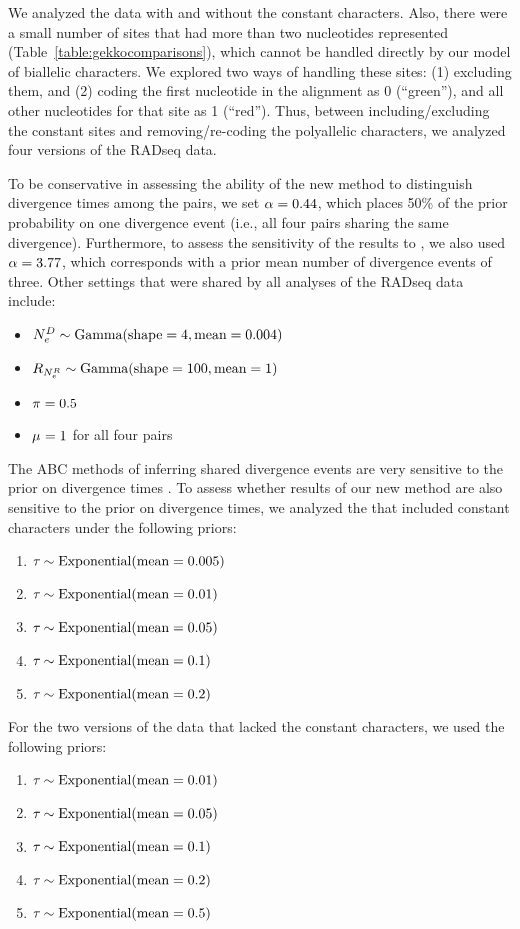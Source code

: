 \ifembed{

}{}

We analyzed the data with and without the constant characters.
Also, there were a small number of sites that had more than two nucleotides
represented
(Table~\ref{table:gekkocomparisons}),
which cannot be handled directly by our model of biallelic characters.
We explored two ways of handling these sites:
(1) excluding them, and
(2) coding the first nucleotide in the alignment as 0 (``green''), and all
other nucleotides for that site as 1 (``red'').
Thus, between including/excluding the constant sites and removing/re-coding the
polyallelic characters, we analyzed four versions of the RADseq data.

To be conservative in assessing the ability of the new method to distinguish
divergence times among the pairs, we set $\concentration = 0.44$, which places
50\% of the prior probability on one divergence event (i.e., all four pairs
sharing the same divergence).
Furthermore, to assess the sensitivity of the results to \concentration, we
also used $\concentration = 3.77$, which corresponds with a prior mean number
of divergence events of three.
Other settings that were shared by all analyses of the  RADseq data
include:
\begin{itemize}
    \item $\epopsize[\descendantpopindex{}] \sim \dgamma{4}{0.004}$
    \item $\rootrelativepopsize \sim \dgamma{100}{1}$
    \item $\gfreq = 0.5$
    \item $\murate = 1$ for all four pairs
\end{itemize}

The ABC methods of inferring shared divergence events are very sensitive to the
prior on divergence times
\citep{Oaks2012,Hickerson2013,Oaks2014reply,Oaks2014dpp}.
To assess whether results of our new method are also sensitive to the
prior on divergence times, we analyzed the \datasets that included constant
characters under the following priors:
\begin{enumerate}
    \item $\divtime \sim \dexponential{0.005}$
    \item $\divtime \sim \dexponential{0.01}$
    \item $\divtime \sim \dexponential{0.05}$
    \item $\divtime \sim \dexponential{0.1}$
    \item $\divtime \sim \dexponential{0.2}$
\end{enumerate}
For the two versions of the  data that lacked the constant
characters, we used the following priors:
\begin{enumerate}
    \item $\divtime \sim \dexponential{0.01}$
    \item $\divtime \sim \dexponential{0.05}$
    \item $\divtime \sim \dexponential{0.1}$
    \item $\divtime \sim \dexponential{0.2}$
    \item $\divtime \sim \dexponential{0.5}$
\end{enumerate}

